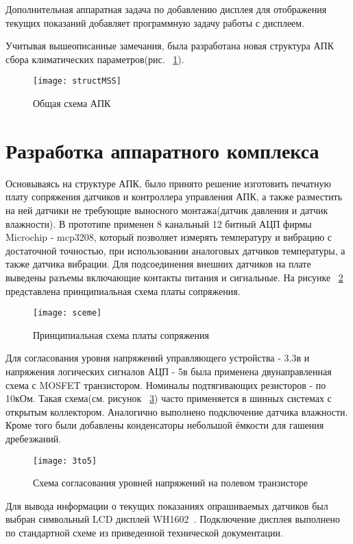 Дополнительная аппаратная задача по добавлению дисплея для отображения текущих показаний добавляет программную задачу работы с дисплеем. 

Учитывая вышеописанные замечания, была разработана новая структура АПК сбора климатических параметров(рис. ~\ref{fig:structMSS}).
\begin{figure}[h]
	\centering
	\texttt{[image: structMSS]}
	\caption{Общая схема АПК}
	\label{fig:structMSS}
\end{figure}

\section{Разработка аппаратного комплекса}
Основываясь на структуре АПК, было принято решение изготовить печатную плату сопряжения датчиков и контроллера управления АПК, а также разместить на ней датчики не требующие выносного монтажа(датчик давления и датчик влажности).  
В прототипе применен 8 канальный 12 битный АЦП фирмы Microchip - mcp3208, который позволяет измерять температуру и вибрацию с достаточной точностью, при использовании аналоговых датчиков температуры, а также датчика вибрации. Для подсоединения внешних датчиков на плате выведены разъемы включающие контакты питания и сигнальные.
На рисунке  ~\ref{fig:sceme} представлена принципиальная схема платы сопряжения. 
\begin{figure}[H]
	\centering
	\texttt{[image: sceme]}
	\caption{Принципиальная схема платы сопряжения}
	\label{fig:sceme}
\end{figure}

Для согласования уровня напряжений управляющего устройства - 3.3в и напряжения логических сигналов АЦП - 5в была применена двунаправленная схема с MOSFET транзистором. Номиналы подтягивающих резисторов - по 10кОм. Такая схема(см. рисунок ~\ref{fig:3to5}) часто применяется в шинных системах с открытым коллектором.  Аналогично выполнено подключение датчика влажности. Кроме того были добавлены конденсаторы небольшой ёмкости для гашения дребезжаний. 
\begin{figure}[H]
	\centering
	\texttt{[image: 3to5]}
	\caption{Схема согласования уровней напряжений на полевом транзисторе}
	\label{fig:3to5}
\end{figure}

Для вывода информации о текущих показаниях опрашиваемых датчиков был выбран символьный LCD дисплей WH1602~\cite{wh1602}. Подключение дисплея выполнено по стандартной схеме из приведенной технической документации.  

